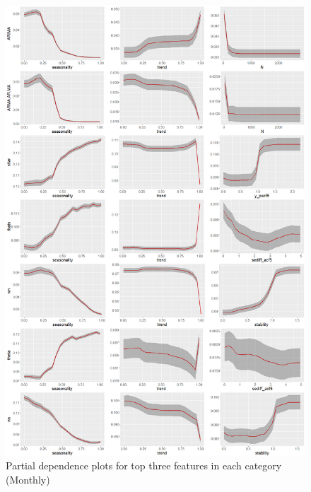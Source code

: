 \documentclass[11pt,a4paper,]{article}
\theoremstyle{definition}
\theoremstyle{definition}
\theoremstyle{definition}
\theoremstyle{remark}
\begin{document}
\begin{figure}
\centering
\includegraphics{figures/pdpmonthly2-1.png}
\caption{\label{fig:pdpmonthly2}Partial dependence plots for top three
features in each category (Monthly)}
\end{figure}

\newpage
\end{document}
